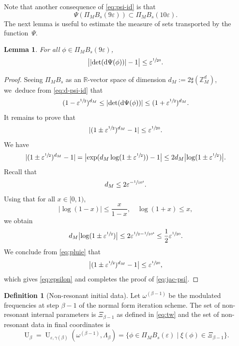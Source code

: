 \documentclass[10pt,a4paper]{amsart}
\theoremstyle{plain}
\newtheorem{lemma}[theorem]{Lemma}
\theoremstyle{definition}
\newtheorem{definition}[theorem]{Definition}
\newcommand{\Z}{\mathbb{Z}}
\newcommand{\R}{\mathbb{R}}
\newcommand{\1}{\mathbf{1}}
\let\epsilon\varepsilon
\begin{document}
Note that another consequence of \eqref{eq:psi-id} is that
\[
\Psi(\Pi_{M}B_{s}(9\epsilon)) \subset \Pi_{M}B_{s}(10\epsilon).
\]
The next lemma is useful to estimate the measure of sets transported by the function~$\Psi$.
\begin{lemma}
\label{lem:meas-psi}
For all $\phi\in\Pi_{M}B_{s}(9\epsilon)$,
\begin{equation}
\label{eq:jac-psi}
\big|
|{\det(\mathrm{d}\Psi(\phi))}|-1
\big|
\leq
\epsilon^{\sfrac{1}{20}}.
\end{equation}
\end{lemma}
\begin{proof}
Seeing $\Pi_{M}B_{s}$ as an $\R$-vector space of dimension $d_{M}:=2\sharp(\Z_{M}^{d})$, we~deduce from \eqref{eq:d-psi-id} that
\[
(1-\epsilon^{\sfrac{1}{2}})^{d_{M}}\leq|{\det(\mathrm{d}\Psi(\phi))}| \leq (1+\epsilon^{\sfrac{1}{2}})^{d_{M}}.
\]
It remains to prove that
\begin{equation}
\label{eq:epsilon}
|(1\pm\epsilon^{\sfrac{1}{2}})^{d_{M}}-1| \leq \epsilon^{\sfrac{1}{20}}.
\end{equation}
We have
\begin{equation}
\label{eq:pluie}
|(1\pm\epsilon^{\sfrac{1}{2}})^{d_{M}}-1|
= \bigl|\exp(d_{M}\log(1\pm\epsilon^{\sfrac{1}{2}}))-1\bigr| \leq 2d_{M}\bigl|\log(1\pm\epsilon^{\sfrac{1}{2}})\bigr|.
\end{equation}
Recall that
\[
d_{M} \leq 2\epsilon^{-\sfrac{1}{10^{4}}}.
\]
Using that for all $x\in[0,1)$,
\[
\bigl|\log(1-x)\bigr|\leq \frac{x}{1-x},\quad \log(1+x)\leq x,
\]
we obtain
\[
d_{M}\bigl|\log(1\pm\epsilon^{\sfrac{1}{2}})\bigr|\leq 2\epsilon^{\sfrac{1}{2}-\sfrac{1}{10^{4}}} \leq \frac{1}{2}\epsilon^{\sfrac{1}{20}}.
\]
We conclude from \eqref{eq:pluie} that
\[
\bigl|(1\pm\epsilon^{\sfrac{1}{2}})^{d_{M}}-1\bigr| \leq \epsilon^{\sfrac{1}{20}},
\]
which gives \eqref{eq:epsilon} and completes the proof of \eqref{eq:jac-psi}.
\end{proof}
\begin{definition}[Non-resonant initial data]
\label{def:u-frak}
Let $\omega^{(\beta-1)}$ be the modulated frequencies at step $\beta-1$ of the normal form iteration scheme. The set of non-resonant internal parameters is $\Xi_{\beta-1}$ as defined in \eqref{eq:tw} and the set of non-resonant data in final coordinates is
\begin{equation}
\label{eq:U}
\operatorname{U}_{\beta}
= \operatorname{U}_{\epsilon,\gamma(\beta)}(\omega^{(\beta-1)},\Lambda_{\beta})
= \big\{\phi\in\Pi_{M}B_{s}(\epsilon)\mid \xi(\phi)\in\Xi_{\beta-1}\big\}.
\end{equation}
\end{definition}
\end{document}
